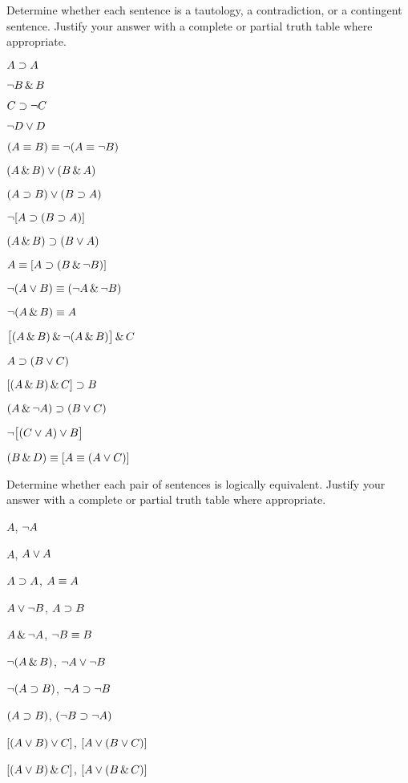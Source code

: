 \solutions
\problempart
\label{pr.TT.TTorC}
Determine whether each sentence is a tautology, a contradiction, or a contingent sentence. Justify your answer with a complete or partial truth table where appropriate.
\begin{earg}
\item $A \supset A$ %
\item $\neg B \,\&\, B$ %
\item $C \supset\neg C$ %
\item $\neg D \vee D$ %
\item $(A \equiv B) \equiv \neg(A\equiv \neg B)$ %
\item $(A\,\&\, B) \vee (B\,\&\, A)$ %
\item $(A \supset B) \vee (B \supset A)$ %
\item $\neg[A \supset (B \supset A)]$ %
\item $(A \,\&\, B) \supset (B \vee A)$  %
\item $A \equiv [A \supset (B \,\&\, \neg B)]$ %
\item $\neg(A \vee B) \equiv (\neg A \,\&\, \neg B)$ %
\item $\neg(A\,\&\, B) \equiv A$ %
\item $\bigl[(A\,\&\, B) \,\&\,\neg(A\,\&\, B)\bigr] \,\&\, C$ %
\item $A\supset(B\vee C)$ %
\item $[(A \,\&\, B) \,\&\, C] \supset B$ %
\item $(A \,\&\,\neg A) \supset (B \vee C)$ %
\item $\neg\bigl[(C\vee A) \vee B\bigr]$ %
\item $(B\,\&\, D) \equiv [A \equiv(A \vee C)]$%
\end{earg}


\solutions
\problempart
\label{pr.TT.equiv}
Determine whether each pair of sentences is logically equivalent. Justify your answer with a complete or partial truth table where appropriate.
\begin{earg}
\item $A$, $\neg A$ %
\item $A$, $A \vee A$ %
\item $A\supset A$, $A \equiv A$ %
\item $A \vee \neg B$, $A\supset B$ %
\item $A \,\&\, \neg A$, $\neg B \equiv B$ %
\item $\neg(A \,\&\, B)$, $\neg A \vee \neg B$ %
\item $\neg(A \supset B)$, $\neg A \supset \neg B$ %
\item $(A \supset B)$, $(\neg B \supset \neg A)$ %
\item $[(A \vee B) \vee C]$, $[A \vee (B \vee C)]$ %
\item $[(A \vee B) \,\&\, C]$, $[A \vee (B \,\&\, C)]$ %
\end{earg}

